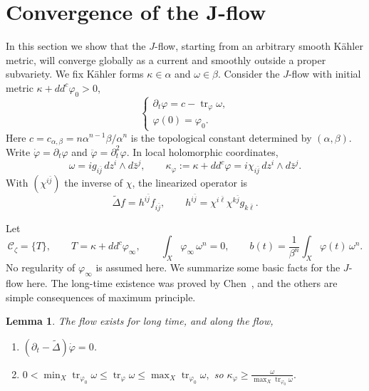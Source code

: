 \documentclass[reqno]{amsart}
\numberwithin{equation}{section}
\newtheorem{lemma}[theorem]{Lemma}
\theoremstyle{definition}
\DeclareMathOperator{\tr}{tr}
\newcommand{\ddc}{dd^c}
\newcommand{\cab}{c_{\alpha,\beta}}
\begin{document}
\section{Convergence of the J-flow}\label{sec:flow}
In this section we show that the $J$-flow, starting from an arbitrary smooth K\"ahler metric, will converge globally as a current and smoothly outside a proper subvariety. We fix  K\"ahler forms $\kappa\in\alpha$ and $\omega\in\beta$. Consider the $J$-flow with initial metric $\kappa+\ddc\varphi_0>0$, \begin{equation}
    \begin{cases}
        \partial_t\varphi=c-\tr_\varphi\omega,\\
        \varphi(0)=\varphi_0.
    \end{cases}
\end{equation} 
Here $c=\cab=n\alpha^{n-1}\beta/\alpha^n$ is the topological constant determined by $(\alpha,\beta).$
Write $\dot\varphi=\partial_t\varphi$ and
$\ddot\varphi=\partial_t^2\varphi$. In local holomorphic coordinates,
\[
 \omega=i g_{i\bar j}\,dz^i\wedge d\bar z^j,\qquad
 \kappa_\varphi:=\kappa+\ddc\varphi=i\chi_{i\bar j}\,dz^i\wedge d\bar z^j.
\]
With $(\chi^{i\bar j})$ the inverse of $\chi$, the linearized
operator is
\begin{equation}\label{eq:flow-linearization}
 \widetilde\Delta f=h^{i\bar j}f_{i\bar j},\qquad
 h^{i\bar j}=\chi^{i\bar\ell}\chi^{k\bar j}g_{k\bar\ell}.
\end{equation}

Let
\[
 \mathcal C_\zeta=\{T\},\qquad T=\kappa+\ddc\varphi_\infty,\qquad
 \int_X\varphi_\infty\,\omega^n=0,
 \qquad b(t)=\frac1{\beta^n}\int_X\varphi(t)\,\omega^n.
\]
No regularity of $\varphi_\infty$ is assumed here. We summarize some basic facts for the $J$-flow here. The long-time existence was proved by Chen~\cite{C04}, and the others are simple consequences of maximum principle. 
\begin{lemma}\label{lem:flow-facts}
The flow exists for long time, and along the flow,
\begin{enumerate}
    \item $(\partial_t-\widetilde\Delta)\dot\varphi=0$.
    \item $0<\min_X\tr_{{\varphi_0}}\omega
   \le\tr_{\varphi}\omega
   \le\max_X\tr_{{\varphi_0}}\omega,$ so $
  \kappa_\varphi
   \ge\frac{\omega}{\max_X\tr_{{\varphi_0}}\omega}.$
   \end{enumerate}
\end{lemma}
\end{document}

